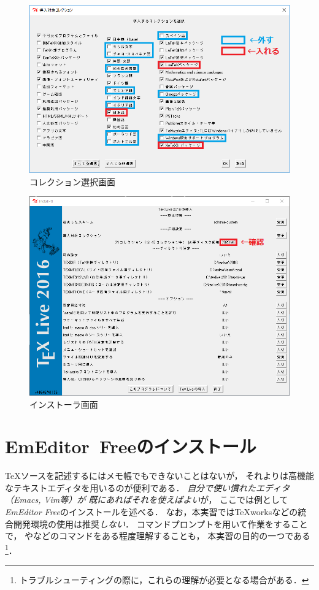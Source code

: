 \documentclass{ltjsarticle}
\begin{document}
\begin{enumerate}
  \clearpage
  \begin{figure}[t]
    \centering
    \includegraphics[scale=.7]{tl16col.png}
    \caption{コレクション選択画面}\label{col}
  \end{figure}

  \begin{figure}[b]
    \centering
    \includegraphics[scale=.5]{tl16top.png}
    \caption{インストーラ画面}\label{top}
  \end{figure}
\end{enumerate}


\section{EmEditor~Freeのインストール}
\TeX ソースを記述するにはメモ帳でもできないことはないが，
それよりは高機能なテキストエディタを用いるのが便利である．
\emph{自分で使い慣れたエディタ（Emacs, Vim等）が
  既にあればそれを使えばよい}が，
ここでは例として\emph{EmEditor Free}のインストールを述べる．
なお，本実習では\TeX worksなどの統合開発環境の使用は推奨\emph{しない}．
コマンドプロンプトを用いて作業をすることで，
やなどのコマンドをある程度理解することも，
本実習の目的の一つである\footnote{トラブルシューティングの際に，これらの理解が必要となる場合がある．}．
\end{document}
